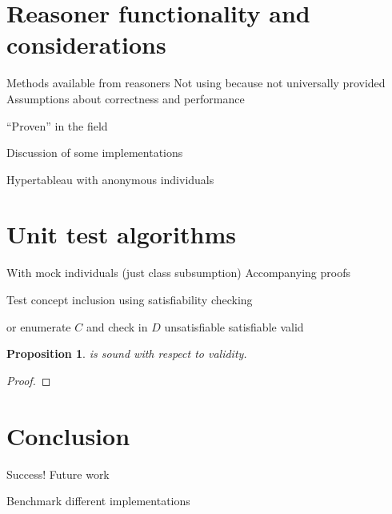 \documentclass[draft]{sig-alternate}
\newtheorem{proposition}{Proposition}
\let\oldtextproc\textproc
\renewcommand{\textproc}[1]{\nohyphens{\oldtextproc{#1}}}
\begin{document}
\section{Reasoner functionality and considerations}

\begin{todos}
  \todo Methods available from reasoners
  \todo Not using  because not universally provided
  \todo Assumptions about correctness and performance
  \begin{todos}
    \todo ``Proven'' in the field
  \end{todos}
  \todo Discussion of some implementations
  \begin{todos}
    \todo Hypertableau with anonymous individuals
  \end{todos}
\end{todos}

\section{Unit test algorithms}

\begin{todos}
  \todo With mock individuals (just class subsumption)
  \todo Accompanying proofs
\end{todos}

\begin{algorithm}[H]
  \caption{Test concept inclusion using satisfiability checking}
  \begin{algorithmic}[1]
        \Comment or enumerate $C$ and check in $D$
        \State \Return unsatisfiable
        \State \Return satisfiable
      \Else
        \State \Return valid
      \EndIf
    \EndFunction
  \end{algorithmic}
\end{algorithm}

\begin{proposition}
   is sound with respect to validity.
\end{proposition}

\begin{proof}
\end{proof}

\section{Conclusion}

\begin{todos}
  \todo Success!
  \todo Future work
  \begin{todos}
    \todo Benchmark different implementations
  \end{todos}
\end{todos}
\end{document}

